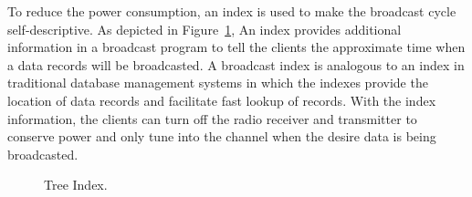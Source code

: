 To reduce the power consumption, an index is used to make the
broadcast cycle self-descriptive. As depicted in
Figure~\ref{fig:index_node}, An index provides additional
information in a broadcast program to tell the clients the
approximate time when a data records will be broadcasted. A
broadcast index is analogous to an index in traditional database
management systems in which the indexes provide the location of
data records and facilitate fast lookup of records. With the index
information, the clients can turn off the radio receiver and
transmitter to conserve power and only tune into the channel when
the desire data is being broadcasted.


\begin{figure}[h]

\centering
{}
\caption{\small Tree Index.\label{fig:index_node}}
\end{figure}

